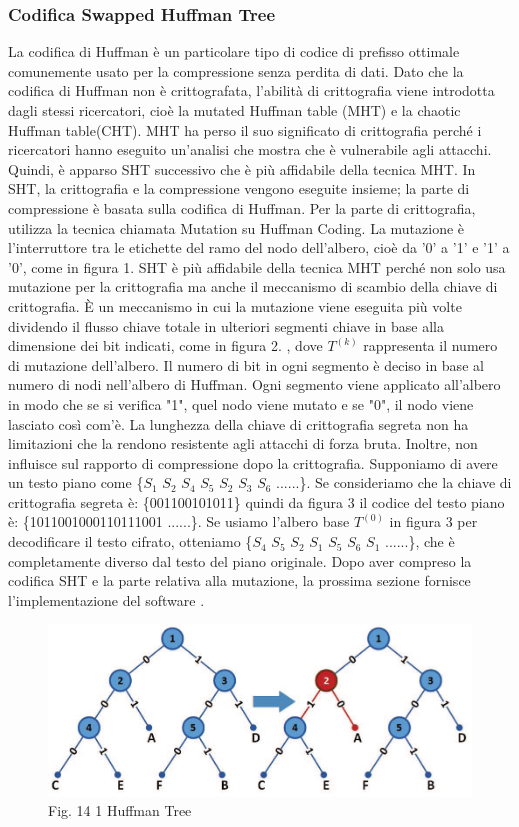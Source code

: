 \documentclass[a4paper]{report} %
\begin{document}
\subsubsection{Codifica Swapped Huffman Tree}
La codifica di Huffman è un particolare tipo di codice di prefisso ottimale comunemente usato per la compressione senza perdita di dati. Dato che la codifica di Huffman non è crittografata, l'abilità di crittografia viene introdotta dagli stessi ricercatori, cioè la mutated Huffman table (MHT) e la chaotic Huffman table(CHT). MHT ha perso il suo significato di crittografia perché i ricercatori hanno eseguito un'analisi che mostra che è vulnerabile agli attacchi. Quindi, è apparso SHT successivo che è più affidabile della tecnica MHT. In SHT, la crittografia e la compressione vengono eseguite insieme; la parte di compressione è basata sulla codifica di Huffman. Per la parte di crittografia, utilizza la tecnica chiamata Mutation su Huffman Coding. La mutazione è l'interruttore tra le etichette del ramo del nodo dell'albero, cioè da '0' a '1' e '1' a '0', come in figura 1. SHT è più affidabile della tecnica MHT perché non solo usa mutazione per la crittografia ma anche il meccanismo di scambio della chiave di crittografia. È un meccanismo in cui la mutazione viene eseguita più volte dividendo il flusso chiave totale in ulteriori segmenti chiave in base alla dimensione dei bit indicati, come in figura 2. , dove $T^{(k)}$ rappresenta il numero di mutazione dell'albero. Il numero di bit in ogni segmento è deciso in base al numero di nodi nell'albero di Huffman. Ogni segmento viene applicato all'albero in modo che se si verifica "1", quel nodo viene mutato e se "0", il nodo viene lasciato così com'è. La lunghezza della chiave di crittografia segreta non ha limitazioni che la rendono resistente agli attacchi di forza bruta. Inoltre, non influisce sul rapporto di compressione dopo la crittografia. Supponiamo di avere un testo piano come \{$S_1$ $S_2$ $S_4$ $S_5$ $S_2$ $S_3$ $S_6$ ......\}. Se consideriamo che la chiave di crittografia segreta è: \{001100101011\} quindi da figura 3 il codice del testo piano è: \{1011001000110111001 ......\}. Se usiamo l'albero base $T^{(0)}$ in figura 3 per decodificare il testo cifrato, otteniamo \{$S_4$ $S_5$ $S_2$ $S_1$ $S_5$ $S_6$ $S_1$ ......\}, che è completamente diverso dal testo del piano originale. Dopo aver compreso la codifica SHT e la parte relativa alla mutazione, la prossima sezione fornisce l'implementazione del software \cite{art:rif.45}.
\begin{figure}
\centering
\includegraphics[scale=.5]{Immagini/SHT1.png}
Fig. 14 1 Huffman Tree
\end{figure}
\end{document}
